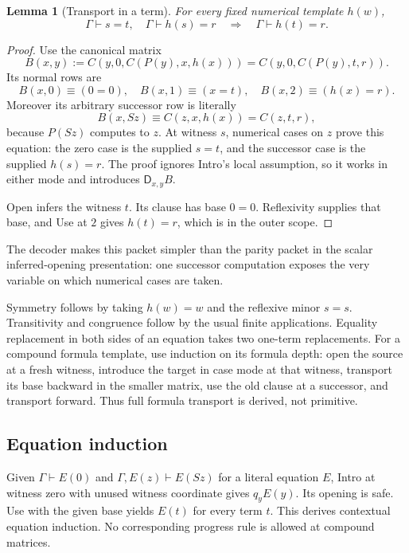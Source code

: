 \documentclass[11pt]{article}
\newtheorem{lemma}[theorem]{Lemma}
\theoremstyle{definition}
\theoremstyle{remark}
\newcommand{\D}{\mathsf D}
\newcommand{\der}{\vdash}
\begin{document}
\begin{lemma}[Transport in a term]
\label{lem:transport}
For every fixed numerical template $h(w)$,
\[
 \Gamma\der s=t,\quad \Gamma\der h(s)=r
 \quad\Longrightarrow\quad
 \Gamma\der h(t)=r.
\]
\end{lemma}
\begin{proof}
Use the canonical matrix
\begin{equation}
 B(x,y):=
 C(y,0,C(P(y),x,h(x)))
 =
 C(y,0,C(P(y),t,r)).
 \label{eq:packet}
\end{equation}
Its normal rows are
\[
 B(x,0)\equiv(0=0),\quad
 B(x,1)\equiv(x=t),\quad
 B(x,2)\equiv(h(x)=r).
\]
Moreover its arbitrary successor row is literally
\[
 B(x,Sz)\equiv C(z,x,h(x))=C(z,t,r),
\]
because $P(Sz)$ computes to $z$.
At witness $s$, numerical cases on $z$ prove this equation:
the zero case is the supplied $s=t$, and the successor
case is the supplied $h(s)=r$. The proof ignores Intro's
local assumption, so it works in either mode and introduces
$\D_{x,y}B$.

Open infers the witness $t$. Its clause has base $0=0$.
Reflexivity supplies that base, and Use at $2$ gives
$h(t)=r$, which is in the outer scope.
\end{proof}

The decoder makes this packet simpler than the parity
packet in the scalar inferred-opening presentation:
one successor computation exposes the very variable
on which numerical cases are taken.

Symmetry follows by taking $h(w)=w$ and the reflexive
minor $s=s$. Transitivity and congruence follow by the
usual finite applications. Equality replacement in both
sides of an equation takes two one-term replacements.
For a compound formula template, use induction on its
formula depth: open the source at a fresh witness,
introduce the target in case mode at that witness,
transport its base backward in the smaller matrix, use
the old clause at a successor, and transport forward.
Thus full formula transport is derived, not primitive.

\subsection{Equation induction}

Given $\Gamma\der E(0)$ and
$\Gamma,E(z)\der E(Sz)$ for a literal equation $E$,
Intro at witness zero with unused witness coordinate
gives $q_yE(y)$. Its opening is safe. Use with the given
base yields $E(t)$ for every term $t$.
This derives contextual equation induction.
No corresponding progress rule is allowed at compound
matrices.
\end{document}
